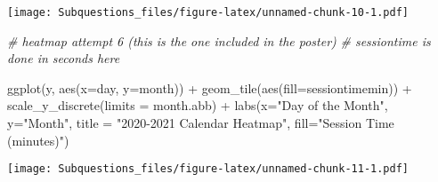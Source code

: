 \documentclass[
]{article}
\newenvironment{Shaded}{\begin{snugshade}}{\end{snugshade}}
\newcommand{\AttributeTok}[1]{\textcolor[rgb]{0.77,0.63,0.00}{#1}}
\newcommand{\CommentTok}[1]{\textcolor[rgb]{0.56,0.35,0.01}{\textit{#1}}}
\newcommand{\FunctionTok}[1]{\textcolor[rgb]{0.00,0.00,0.00}{#1}}
\newcommand{\NormalTok}[1]{#1}
\newcommand{\SpecialCharTok}[1]{\textcolor[rgb]{0.00,0.00,0.00}{#1}}
\newcommand{\StringTok}[1]{\textcolor[rgb]{0.31,0.60,0.02}{#1}}
\begin{document}
\texttt{[image: Subquestions\_files/figure-latex/unnamed-chunk-10-1.pdf]}

\begin{Shaded}
\begin{Highlighting}[]
\CommentTok{\# heatmap attempt 6 (this is the one included in the poster)}
\CommentTok{\# sessiontime is done in seconds here }

\FunctionTok{ggplot}\NormalTok{(y, }\FunctionTok{aes}\NormalTok{(}\AttributeTok{x=}\NormalTok{day, }\AttributeTok{y=}\NormalTok{month)) }\SpecialCharTok{+} \FunctionTok{geom\_tile}\NormalTok{(}\FunctionTok{aes}\NormalTok{(}\AttributeTok{fill=}\NormalTok{sessiontimemin)) }\SpecialCharTok{+} 
\FunctionTok{scale\_y\_discrete}\NormalTok{(}\AttributeTok{limits =}\NormalTok{ month.abb) }\SpecialCharTok{+} 
 \FunctionTok{labs}\NormalTok{(}\AttributeTok{x=}\StringTok{"Day of the Month"}\NormalTok{,}
       \AttributeTok{y=}\StringTok{"Month"}\NormalTok{,}
       \AttributeTok{title =} \StringTok{"2020{-}2021 Calendar Heatmap"}\NormalTok{, }
       \AttributeTok{fill=}\StringTok{"Session Time (minutes)"}\NormalTok{)}
\end{Highlighting}
\end{Shaded}

\texttt{[image: Subquestions\_files/figure-latex/unnamed-chunk-11-1.pdf]}
\end{document}

